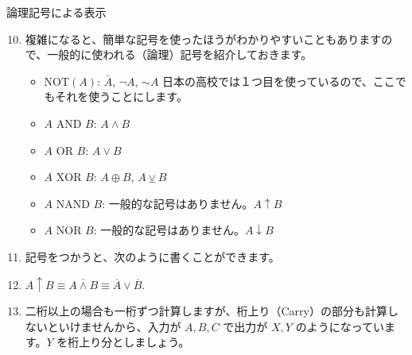 \documentclass[10pt, dvipdfmx]{beamer}
\begin{document}
\begin{frame}{論理記号による表示}
\begin{enumerate}
\setcounter{enumi}{9}

\item 複雑になると、簡単な記号を使ったほうがわかりやすいこともありますので、一般的に使われる（論理）記号を紹介しておきます。
\begin{itemize}
    \item \(\mbox{NOT}(A)\): \(\bar{A}\), \(\neg A\), \(\sim A\) 日本の高校では１つ目を使っているので、ここでもそれを使うことにします。
    \item \(A \mbox{ AND } B\): \(A \land B\)
    \item \(A \mbox{ OR } B\): \(A \lor B\)
    \item \(A \mbox{ XOR } B\): \(A \oplus B\), \(A \veebar B\)
    \item \(A \mbox{ NAND } B\): 一般的な記号はありません。\(A \uparrow B\)
    \item \(A \mbox{ NOR } B\): 一般的な記号はありません。\(A \downarrow B\)
\end{itemize}
\item 記号をつかうと、次のように書くことができます。
    \item \(A \uparrow B \equiv \overline{A \land B} \equiv \overline{A} \lor \overline{B}\).

\item 二桁以上の場合も一桁ずつ計算しますが、桁上り（Carry）の部分も計算しないといけませんから、入力が \(A, B, C\) で出力が \(X, Y\) のようになっています。\(Y\) を桁上り分としましょう。

\end{enumerate}
\end{frame}
\end{document}
